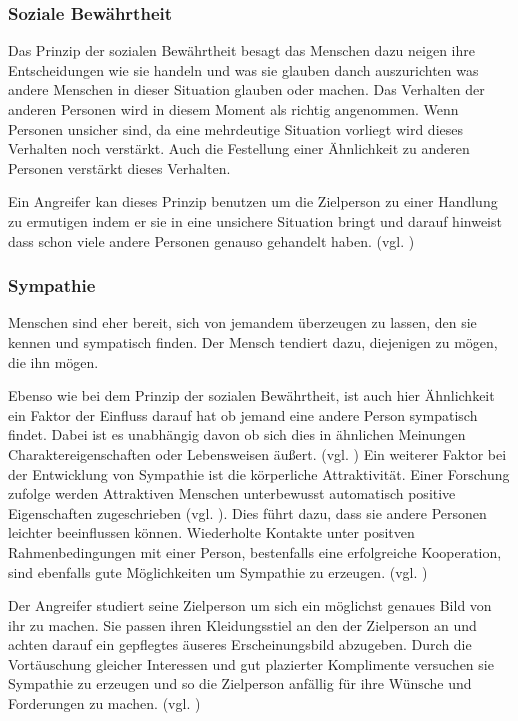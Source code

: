 \subsubsection{Soziale Bewährtheit}

Das Prinzip der sozialen Bewährtheit besagt das Menschen dazu neigen ihre Entscheidungen wie sie handeln und was sie glauben danch auszurichten was andere Menschen in dieser Situation glauben oder machen. Das Verhalten der anderen Personen wird in diesem Moment als richtig angenommen. Wenn Personen unsicher sind, da eine mehrdeutige Situation vorliegt wird dieses Verhalten noch verstärkt. Auch die Festellung einer Ähnlichkeit zu anderen Personen verstärkt dieses Verhalten.

Ein Angreifer kan dieses Prinzip benutzen um die Zielperson zu einer Handlung zu ermutigen indem er sie in eine unsichere Situation bringt und darauf hinweist dass schon viele andere Personen genauso gehandelt haben. (vgl. \cite{PsychDesÜberzeugensSozBew})


\subsubsection{Sympathie}

\glqq Menschen sind eher bereit, sich von jemandem überzeugen zu lassen, den sie kennen und sympatisch finden.\grqq{} \cite{PsychDesÜberzeugensSym}
Der Mensch tendiert dazu, diejenigen zu mögen, die ihn mögen. \cite{sym}

Ebenso wie bei dem Prinzip der sozialen Bewährtheit, ist auch hier Ähnlichkeit ein Faktor der Einfluss darauf hat ob jemand eine andere Person sympatisch findet. Dabei ist es unabhängig davon ob sich dies in ähnlichen Meinungen Charaktereigenschaften oder Lebensweisen äußert. (vgl. \cite{sym1})
Ein weiterer Faktor bei der Entwicklung von Sympathie ist die körperliche Attraktivität. Einer Forschung zufolge werden Attraktiven Menschen unterbewusst automatisch positive Eigenschaften zugeschrieben (vgl. \cite{sym2}). Dies führt dazu, dass sie andere Personen leichter beeinflussen können. 
Wiederholte Kontakte unter positven Rahmenbedingungen mit einer Person, bestenfalls eine erfolgreiche Kooperation, sind ebenfalls gute Möglichkeiten um Sympathie zu erzeugen. (vgl. \cite{PsychDesÜberzeugensSymp})

Der Angreifer studiert seine Zielperson um sich ein möglichst genaues Bild von ihr zu machen. Sie passen ihren Kleidungsstiel an den der Zielperson an und achten darauf ein gepflegtes äuseres Erscheinungsbild abzugeben. Durch die Vortäuschung gleicher Interessen und gut plazierter Komplimente versuchen sie Sympathie zu erzeugen und so die Zielperson anfällig für ihre Wünsche und Forderungen zu machen. (vgl. \cite{PsychDesÜberzeugensSymp})



